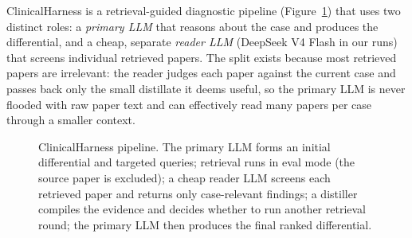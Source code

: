 \documentclass{article}
\begin{document}
ClinicalHarness is a retrieval-guided diagnostic pipeline (Figure~\ref{fig:harness}) that uses two distinct
roles: a \emph{primary LLM} that reasons about the case and produces the differential, and a cheap, separate
\emph{reader LLM} (DeepSeek V4 Flash in our runs) that screens individual retrieved papers. The split exists
because most retrieved papers are irrelevant: the reader judges each paper against the current case and
passes back only the small distillate it deems useful, so the primary LLM is never flooded with raw paper
text and can effectively read many papers per case through a smaller context.

\begin{figure}[t]
  \centering
  \caption{ClinicalHarness pipeline. The primary LLM forms an initial differential and targeted queries;
  retrieval runs in eval mode (the source paper is excluded); a cheap reader LLM screens each retrieved paper
  and returns only case-relevant findings; a distiller compiles the evidence and decides whether to run
  another retrieval round; the primary LLM then produces the final ranked differential.}
  \label{fig:harness}
\end{figure}
\end{document}
